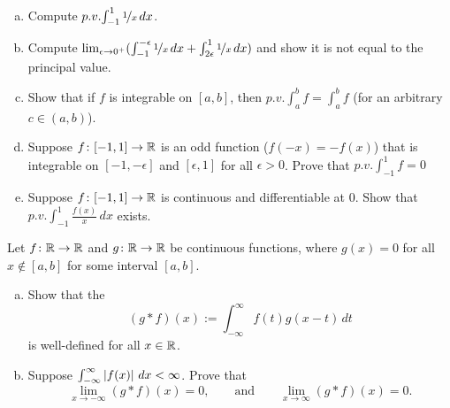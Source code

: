 \begin{exercise}
\leavevmode
\begin{enumerate}[a)]
\item
Compute $p.v.\!\int_{-1}^1 \nicefrac{1}{x}\,dx$.
\item
Compute
$\lim_{\epsilon\to 0^+}
( \int_{-1}^{-\epsilon} \nicefrac{1}{x}\,dx + 
\int_{2\epsilon}^1 \nicefrac{1}{x}\,dx )$ and show it is not equal
to the principal value.
\item
Show that if $f$ is integrable on $[a,b]$, then
$p.v.\!\int_a^b f = \int_a^b f$ (for an arbitrary $c \in (a,b)$).
\item
Suppose $f \colon [-1,1] \to {\mathbb{R}}$
is an odd function ($f(-x)=-f(x)$) that is integrable on
$[-1,-\epsilon]$ and $[\epsilon,1]$ for all $\epsilon >0$.
Prove that 
$p.v.\!\int_{-1}^1 f = 0$
\item
Suppose 
$f \colon [-1,1] \to {\mathbb{R}}$ is continuous and differentiable at 0.  Show that
$p.v.\!\int_{-1}^1 \frac{f(x)}{x}\,dx$ exists.
\end{enumerate}
\end{exercise}

\begin{samepage}
\begin{exercise}
Let $f \colon {\mathbb{R}} \to {\mathbb{R}}$ and 
$g \colon {\mathbb{R}} \to {\mathbb{R}}$ be continuous functions, where
$g(x) = 0$ for all $x \notin [a,b]$ for some interval $[a,b]$.
\begin{enumerate}[a)]
\item
Show that the
\emph{}
\begin{equation*}
(g * f)(x) := \int_{-\infty}^\infty f(t)g(x-t)\,dt 
\end{equation*}
is well-defined for all $x \in {\mathbb{R}}$.
\item
Suppose $\int_{-\infty}^\infty \left\lvert {f(x)} \right\rvert\,dx < \infty$.  Prove that
\begin{equation*}
\lim_{x \to -\infty} (g * f)(x) = 0, \qquad \text{and} \qquad
\lim_{x \to \infty} (g * f)(x) = 0 .
\end{equation*}
\end{enumerate}
\end{exercise}
\end{samepage}
